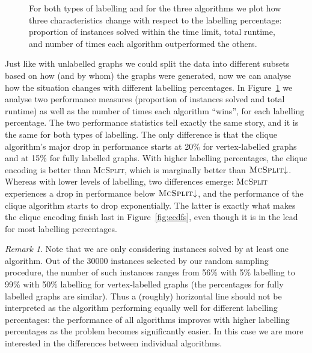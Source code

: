 \documentclass{l4proj}
\theoremstyle{definition}
\theoremstyle{remark}
\newtheorem{remark}{Remark}[chapter]
\begin{document}
\begin{figure}
\begin{subfigure}[t]{0.49\textwidth}
  \end{subfigure}
  \caption{For both types of labelling and for the three algorithms we plot how
    three characteristics change with respect to the labelling percentage:
    proportion of instances solved within the time limit, total runtime, and
    number of times each algorithm outperformed the others.}
  \label{fig:linecharts}
\end{figure}

Just like with unlabelled graphs we could split the data into different subsets
based on how (and by whom) the graphs were generated, now we can analyse how the
situation changes with different labelling percentages. In
Figure~\ref{fig:linecharts} we analyse two performance measures (proportion of
instances solved and total runtime) as well as the number of times each
algorithm ``wins'', for each labelling percentage. The two performance
statistics tell exactly the same story, and it is the same for both types of
labelling. The only difference is that the clique algorithm's major drop in
performance starts at 20\% for vertex-labelled graphs and at 15\% for fully
labelled graphs. With higher labelling percentages, the clique encoding is
better than \textsc{McSplit}, which is marginally better than
$\textsc{McSplit}{\downarrow}$. Whereas with lower levels of labelling, two
differences emerge: \textsc{McSplit} experiences a drop in performance below
$\textsc{McSplit}{\downarrow}$, and the performance of the clique algorithm
starts to drop exponentially. The latter is exactly what makes the clique
encoding finish last in Figure~\ref{fig:ecdfs}, even though it is in the lead
for most labelling percentages.

\begin{remark}
Note that we are only considering instances solved by at least one algorithm.
Out of the \num{30000} instances selected by our random sampling procedure, the
number of such instances ranges from 56\% with 5\% labelling to 99\% with 50\%
labelling for vertex-labelled graphs (the percentages for fully labelled graphs
are similar). Thus a (roughly) horizontal line should not be interpreted as the
algorithm performing equally well for different labelling percentages: the
performance of all algorithms improves with higher labelling percentages as the
problem becomes significantly easier. In this case we are more interested in the
differences between individual algorithms.
\end{remark}
\end{document}
